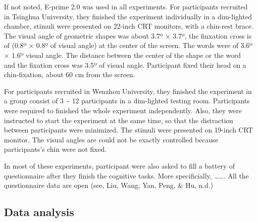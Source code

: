 \documentclass[man]{apa6}
\begin{document}
If not noted, E-prime 2.0 was used in all experiments. For participants recruited in Tsinghua University, they finished the experiment individually in a dim-lighted chamber, stimuli were presented on 22-inch CRT monitors, with a chin-rest brace. The visual angle of geometric shapes was about 3.7º × 3.7º, the finxation cross is of (0.8º × 0.8º of visual angle) at the center of the screen. The words were of 3.6º × 1.6º visual angle. The distance between the center of the shape or the word and the fixation cross was 3.5º of visual angle. Participant fixed their head on a chin-fixation, about 60 cm from the screen.

For participants recruited in Wenzhou University, they finished the experiment in a group consist of 3 \textasciitilde{} 12 participants in a dim-lighted testing room. Participants were required to finished the whole experiment independently. Also, they were instructed to start the experiment at the same time, so that the distraction between participants were minimized. The stimuli were presented on 19-inch CRT monitor. The visual angles are could not be exactly controlled because participants's chin were not fixed.

In most of these experiments, participant were also asked to fill a battery of questionnaire after they finish the cognitive tasks. More specificially, \ldots{}\ldots{}. All the questionnaire data are open (see, Liu, Wang, Yan, Peng, \& Hu, n.d.)

\hypertarget{data-analysis}{%
\subsection{Data analysis}\label{data-analysis}}
\end{document}
